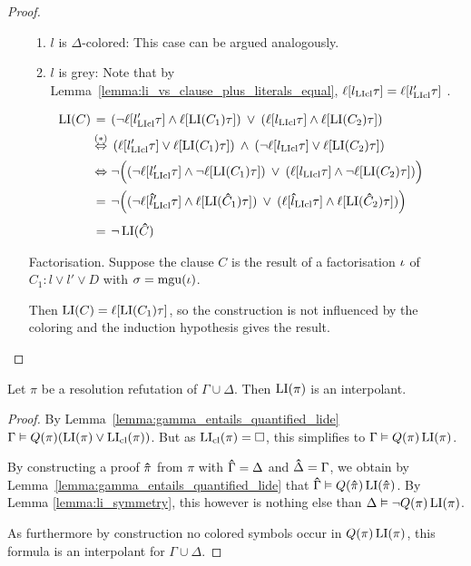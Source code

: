 \documentclass[,%
	draft=false,%
	numbers=noendperiod
	11pt,
	a4paper,
	oneside,%
	openany,
]{memoir}
\begin{document}
\begin{proof}
\begin{itemize}
\begin{enumerate}
				\item $l$ is $\Delta$-colored:
					This case can be argued analogously.

				\item $l$ is grey:
					Note that by Lemma~\ref{lemma:li_vs_clause_plus_literals_equal}, $\ell[l_{\operatorname{LIcl}}\tau] = \ell[l'_{\operatorname{LIcl}}\tau]$ \markB.
					\begin{align*}
						\hspace*{\dimexpr-\leftmargini-\leftmarginii}
						\LI(C) &\stackrel{{\phantom{\markB}}}=
						(\lnot {\lifboth{l'\cll\tau}} \land \lifboth{\LI(C_1)\tau}) \spam\lor 
						(\lifboth{l\cll\tau} \land \lifboth{\LI(C_2)\tau})\\
						&\stackrel{{\markB}}\semiff\,
						({\lifboth{l'\cll\tau}} \lor \lifboth{\LI(C_1)\tau}) \spam\land 
						(\lnot \lifboth{l\cll\tau} \lor \lifboth{\LI(C_2)\tau})\\
						&\stackrel{{\phantom{\markB}}}\semiff \lnot \Big( (\lnot {\lifboth{l'\cll\tau}} \land \lnot \lifboth{\LI(C_1)\tau}) \spam\lor 
						(\lifboth{l\cll\tau} \land \lnot\lifboth{\LI(C_2)\tau}) \Big) \\
						&\stackrel{{\phantom{\markB}}}=\lnot \Big( (\lnot {\lifboth{\bhat l'\cll\tau}} \land \lifboth{\LI(\bhat C_1)\tau}) \spam\lor 
						(\lifboth{\bhat l\cll\tau} \land \lifboth{\LI(\bhat C_2)\tau}) \Big)\\
						& \stackrel{{\phantom{\markB}}}= \lnot \LI(\bhat C) 
					\end{align*}


			\end{enumerate}



		\item[Factorisation.]
			Suppose the clause $C$ is the result of a factorisation $\iota$ of $C_1: l \lor l' \lor D$ 
			with $\sigma = \operatorname{mgu}(\iota)$.

			Then $\operatorname{LI}(C) = \ell[\operatorname{LI}(C_1)\tau]$, so the construction is not influenced by the coloring and the induction hypothesis gives the result.
			\qedhere
	\end{itemize}
\end{proof}

\begin{thm}
	Let $\pi$ be a resolution refutation of $\Gamma\cup\Delta$.
	Then $\operatorname{LI}( \pi )$ is an interpolant.
\end{thm}
\begin{proof}
	By Lemma~\ref{lemma:gamma_entails_quantified_lide}
	$\Gamma \vDash Q(\pi)(\operatorname{LI}(\pi) \lor \operatorname{LI}_{\operatorname{cl}}(\pi))$.
	But as $\operatorname{LI}_{\operatorname{cl}}(\pi) = \square$, this simplifies to
	$\Gamma \vDash Q(\pi)\operatorname{LI}(\pi)$.

	By constructing a proof $\bm\hat \pi$ from $\pi$ with $\bm\hat \Gamma = \Delta$ and $\bm\hat \Delta = \Gamma$, we obtain by Lemma~\ref{lemma:gamma_entails_quantified_lide} that $\bm\hat\Gamma \vDash Q(\bm\hat \pi)\operatorname{LI}(\bm\hat \pi)$.
	By Lemma \ref{lemma:li_symmetry}, this however is nothing else than
	$\Delta \vDash \lnot Q(\pi) \operatorname{LI}(\pi)$. 

	As furthermore by construction no colored symbols occur in $Q(\pi) \operatorname{LI}(\pi)$, this formula is an interpolant for $\Gamma\cup\Delta$.
\end{proof}
\end{document}
